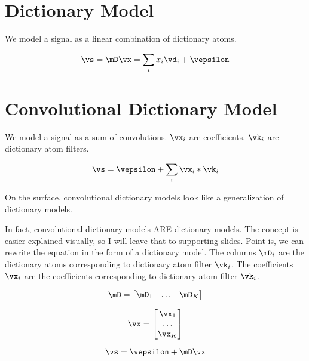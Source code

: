 \documentclass{article}
\begin{document}
\section{Dictionary Model}

We model a signal as a linear combination of dictionary atoms.

\begin{equation}
\vs = \mD\vx = \sum_{i} x_i\vd_i + \vepsilon
\end{equation}

\section{Convolutional Dictionary Model}

We model a signal as a sum of convolutions. $\vx_i$ are coefficients. $\vk_i$ are dictionary atom filters.

\begin{equation}
\vs = \vepsilon + \sum_{i} \vx_i * \vk_i
\end{equation}

On the surface, convolutional dictionary models look like a generalization of dictionary models.

In fact, convolutional dictionary models ARE dictionary models. The concept is easier explained visually, so I will leave that to supporting slides.  Point is, we can rewrite the equation in the form of a dictionary model. The columns $\mD_i$ are the dictionary atoms corresponding to dictionary atom filter $\vk_i$. The coefficients $\vx_i$ are the coefficients corresponding to dictionary atom filter $\vk_i$.


\begin{equation}
\mD = \begin{bmatrix} \mD_1 & \hdots & \mD_K \end{bmatrix}
\end{equation}

\begin{equation}
\vx = \begin{bmatrix} \vx_1 \\
                      \hdots \\ 
                      \vx_K 
      \end{bmatrix}
\end{equation}


\begin{equation}
\vs = \vepsilon + \mD\vx
\end{equation}
\end{document}
